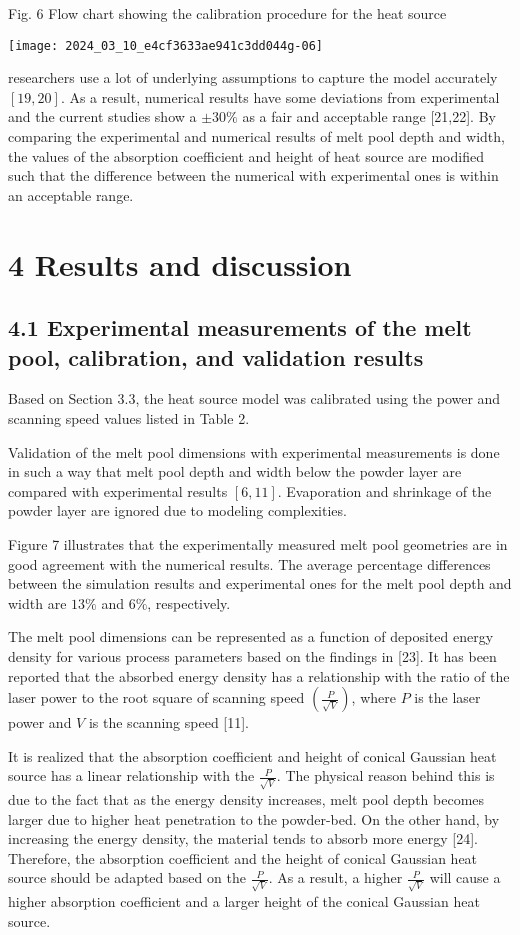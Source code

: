 \documentclass[10pt]{article}
\begin{document}
Fig. 6 Flow chart showing the calibration procedure for the heat source

\begin{center}
\texttt{[image: 2024\_03\_10\_e4cf3633ae941c3dd044g-06]}
\end{center}

researchers use a lot of underlying assumptions to capture the model accurately $[19,20]$. As a result, numerical results have some deviations from experimental and the current studies show a $\pm 30 \%$ as a fair and acceptable range [21,22]. By comparing the experimental and numerical results of melt pool depth and width, the values of the absorption coefficient and height of heat source are modified such that the difference between the numerical with experimental ones is within an acceptable range.

\section*{4 Results and discussion}
\subsection*{4.1 Experimental measurements of the melt pool, calibration, and validation results}
Based on Section 3.3, the heat source model was calibrated using the power and scanning speed values listed in Table 2.

Validation of the melt pool dimensions with experimental measurements is done in such a way that melt pool depth and width below the powder layer are compared with experimental results $[6,11]$. Evaporation and shrinkage of the powder layer are ignored due to modeling complexities.

Figure 7 illustrates that the experimentally measured melt pool geometries are in good agreement with the numerical results. The average percentage differences between the simulation results and experimental ones for the melt pool depth and width are $13 \%$ and $6 \%$, respectively.

The melt pool dimensions can be represented as a function of deposited energy density for various process parameters based on the findings in [23]. It has been reported that the absorbed energy density has a relationship with the ratio of the laser power to the root square of scanning speed $\left(\frac{P}{\sqrt{V}}\right)$, where $P$ is the laser power and $V$ is the scanning speed [11].

It is realized that the absorption coefficient and height of conical Gaussian heat source has a linear relationship with the $\frac{P}{\sqrt{V}}$. The physical reason behind this is due to the fact that as the energy density increases, melt pool depth becomes larger due to higher heat penetration to the powder-bed. On the other hand, by increasing the energy density, the material tends to absorb more energy [24]. Therefore, the absorption coefficient and the height of conical Gaussian heat source should be adapted based on the $\frac{P}{\sqrt{V}}$. As a result, a higher $\frac{P}{\sqrt{V}}$ will cause a higher absorption coefficient and a larger height of the conical Gaussian heat source.
\end{document}
